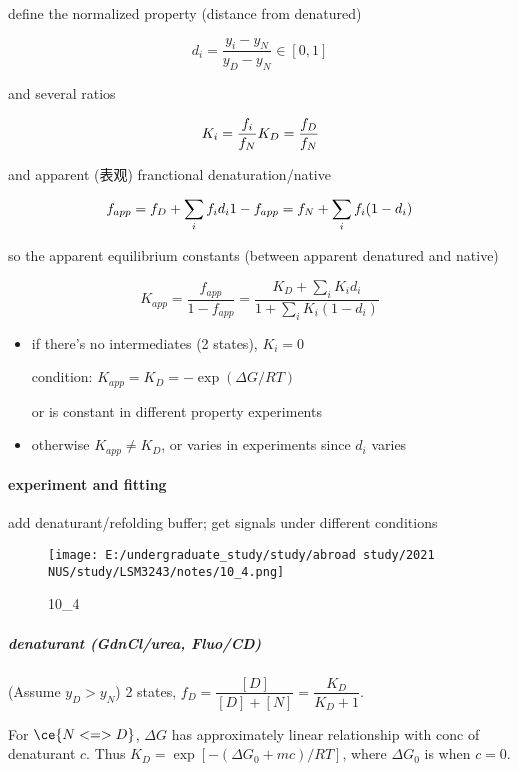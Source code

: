 \documentclass[]{article}
\let\oldparagraph\paragraph
\renewcommand{\paragraph}[1]{\oldparagraph{#1}\mbox{}}
\let\oldsubparagraph\subparagraph
\renewcommand{\subparagraph}[1]{\oldsubparagraph{#1}\mbox{}}
\begin{document}
define the normalized property (distance from denatured)

\[d_i=\dfrac{y_i-y_N}{y_D-y_N} \in [0,1]\]

and several ratios

\[K_{i}=\dfrac{f_{i}}{f_N}\\
K_{D}=\dfrac{f_D}{f_N}\]

and apparent (表观) franctional denaturation/native

\[f_{app}=f_D+\sum_if_id_i\\
1-f_{app}=f_N+\sum_if_i(1-d_i)\]

so the apparent equilibrium constants (between apparent denatured and
native)

\[K_{app}=\dfrac{f_{app}}{1-f_{app}}=\dfrac{K_D+\sum\limits_iK_id_i}{1+\sum\limits_iK_i(1-d_i)}{}\]

\begin{itemize}
\item
  if there's no intermediates (2 states), \(K_i=0\)

  condition: \(K_{app}=K_D=-\exp(\Delta G/RT)\)

  or is constant in different property experiments
\item
  otherwise \(K_{app}\neq K_D\), or varies in experiments since \(d_i\)
  varies
\end{itemize}

\hypertarget{experiment-and-fitting}{%
\paragraph{experiment and fitting}\label{experiment-and-fitting}}

add denaturant/refolding buffer; get signals under different conditions

\begin{figure}
\centering
\texttt{[image: E:/undergraduate\_study/study/abroad study/2021 NUS/study/LSM3243/notes/10\_4.png]}
\caption{10\_4}
\end{figure}

\hypertarget{denaturant-gdnclurea-fluocd}{%
\subparagraph{denaturant (GdnCl/urea,
Fluo/CD)}\label{denaturant-gdnclurea-fluocd}}

(Assume \(y_D>y_N\)) 2 states,
\(f_D=\dfrac{[D]}{[D]+[N]}=\dfrac{K_D}{K_D+1}\).

For \(\ce{N<=>D}\), \(\Delta G\) has approximately linear relationship
with conc of denaturant \(c\). Thus \(K_D=\exp[-(\Delta G_0+mc)/RT]\),
where \(\Delta G_0\) is when \(c=0\).
\end{document}
